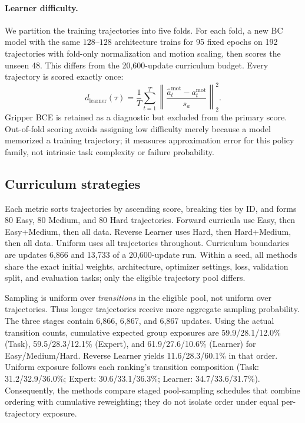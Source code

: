 \paragraph{Learner difficulty.}
We partition the training trajectories into five folds. For each fold, a new
BC model with the same $128$--$128$ architecture trains for 95 fixed epochs on
192 trajectories with fold-only normalization and motion scaling, then scores
the unseen 48. This differs from the 20,600-update curriculum budget. Every
trajectory is scored exactly once:
\begin{equation}
d_{\mathrm{learner}}(\tau)=\frac{1}{T}\sum_{t=1}^{T}
\left\|\frac{\hat a_t^{\mathrm{mot}}-a_t^{\mathrm{mot}}}{s_a}\right\|_2^2.
\end{equation}
Gripper BCE is retained as a diagnostic but excluded from the primary score.
Out-of-fold scoring avoids assigning low difficulty merely because a model
memorized a training trajectory; it measures approximation error for this
policy family, not intrinsic task complexity or failure probability.

\subsection{Curriculum strategies}
Each metric sorts trajectories by ascending score, breaking ties by ID, and
forms 80 Easy, 80 Medium, and 80 Hard trajectories. Forward curricula use
Easy, then Easy+Medium, then all data. Reverse Learner uses Hard, then
Hard+Medium, then all data. Uniform uses all trajectories throughout.
Curriculum boundaries are updates 6,866 and 13,733 of a 20,600-update run.
Within a seed, all methods share the exact initial weights, architecture,
optimizer settings, loss, validation split, and evaluation tasks; only the
eligible trajectory pool differs.

Sampling is uniform over \emph{transitions} in the eligible pool, not uniform
over trajectories. Thus longer trajectories receive more aggregate sampling
probability. The three stages contain 6,866, 6,867, and 6,867 updates. Using
the actual transition counts, cumulative expected group exposures are
59.9/28.1/12.0\% (Task), 59.5/28.3/12.1\% (Expert), and
61.9/27.6/10.6\% (Learner) for Easy/Medium/Hard. Reverse Learner yields
11.6/28.3/60.1\% in that order. Uniform exposure follows each ranking's
transition composition (Task: 31.2/32.9/36.0\%; Expert: 30.6/33.1/36.3\%;
Learner: 34.7/33.6/31.7\%). Consequently, the methods compare staged
pool-sampling schedules that combine ordering with cumulative reweighting; they
do not isolate order under equal per-trajectory exposure.
